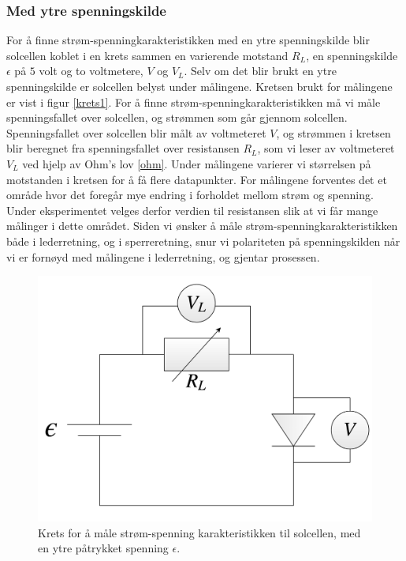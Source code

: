 \documentclass[%
 reprint,
 amsmath,amssymb,
 aps,
 norsk,
 booktabs
]{revtex4-1}
\begin{document}
\subsubsection{Med ytre spenningskilde}
For å finne strøm-spenningkarakteristikken med en ytre spenningskilde blir solcellen koblet i en krets sammen en varierende motstand $R_L$, en spenningskilde $\epsilon$ på $5$ volt og to voltmetere, $V$ og $V_L$. Selv om det blir brukt en ytre spenningskilde er solcellen belyst under målingene. Kretsen brukt for målingene er vist i figur \vref{krets1}. For å finne strøm-spenningkarakteristikken må vi måle spenningsfallet over solcellen, og strømmen som går gjennom solcellen. Spenningsfallet over solcellen blir målt av voltmeteret $V$, og strømmen i kretsen blir beregnet fra spenningsfallet over resistansen $R_L$, som vi leser av voltmeteret $V_L$ ved hjelp av Ohm's lov \eqref{ohm}. Under målingene varierer vi størrelsen på motstanden i kretsen for å få flere datapunkter. For målingene forventes det et område hvor det foregår mye endring i forholdet mellom strøm og spenning. Under eksperimentet velges derfor verdien til resistansen slik at vi får mange målinger i dette området. Siden vi ønsker å måle strøm-spenningkarakteristikken både i lederretning, og i sperreretning, snur vi polariteten på spenningskilden når vi er fornøyd med målingene i lederretning, og gjentar prosessen.
\begin{figure}[h!]
  \centering
  \includegraphics[scale=0.15]{krets1.png}
  \caption{Krets for å måle strøm-spenning karakteristikken til solcellen, med en ytre påtrykket spenning $\epsilon$.}
  \label{krets1}
\end{figure}
\end{document}
